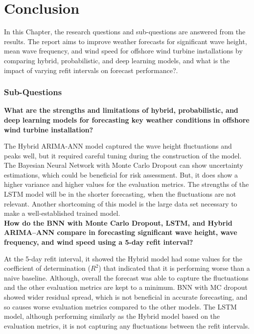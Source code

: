 \chapter{Conclusion}
In this Chapter, the research questions and sub-questions are answered from the results. The report aims to improve weather forecasts for significant wave height, mean wave frequency, and wind speed for offshore wind turbine installations by comparing hybrid, probabilistic, and deep learning models, and what is the impact of varying refit intervals on forecast performance?.

\subsection*{Sub-Questions}
\noindent \textbf{What are the strengths and limitations of hybrid, probabilistic, and deep learning models for forecasting key weather conditions in offshore wind turbine installation?}

\noindent The Hybrid ARIMA-ANN model captured the wave height fluctuations and peaks well, but it required careful tuning during the construction of the model. The Bayesian Neural Network with Monte Carlo Dropout can show uncertainty estimations, which could be beneficial for risk assessment. But, it does show a higher variance and higher values for the evaluation metrics. The strengths of the LSTM model will be in the shorter forecasting, when the fluctuations are not relevant. Another shortcoming of this model is the large data set necessary to make a well-established trained model. \\

\noindent \textbf{How do the BNN with Monte Carlo Dropout, LSTM, and Hybrid ARIMA–ANN compare in forecasting significant wave height, wave frequency, and wind speed using a 5-day refit interval?}

\noindent At the 5-day refit interval, it showed the Hybrid model had some values for the coefficient of determination ($R^2$) that indicated that it is performing worse than a naive baseline. Although, overall the forecast was able to capture the fluctuations and the other evaluation metrics are kept to a minimum. BNN with MC dropout showed wider residual spread, which is not beneficial in accurate forecasting, and so causes worse evaluation metrics compared to the other models. The LSTM model, although performing similarly as the Hybrid model based on the evaluation metrics, it is not capturing any fluctuations between the refit intervals.\\

